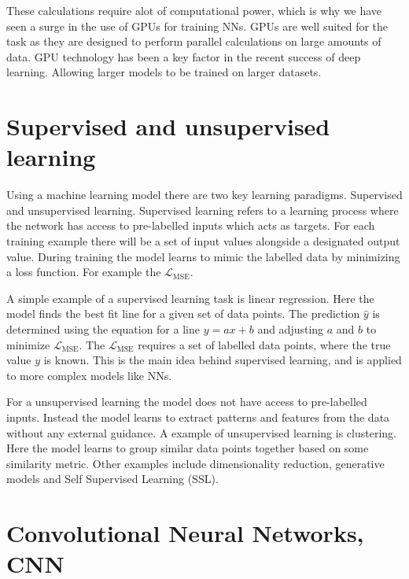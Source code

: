 These calculations require alot of computational power, which is why we have seen a surge in the use of GPUs for training NNs. GPUs are well suited for the task as they are designed to perform parallel calculations on large amounts of data. GPU technology has been a key factor in the recent success of deep learning.
Allowing larger models to be trained on larger datasets.

\section{Supervised and unsupervised learning}
Using a machine learning model there are two key learning paradigms. Supervised and unsupervised learning. Supervised learning refers to a learning process where the network has access to pre-labelled inputs which acts as targets.
For each training example there will be a set of input values alongside a designated output value. During training the model learns to mimic the labelled data by minimizing a loss function. For example the $\mathcal{L}_\text{MSE}$.

A simple example of a supervised learning task is linear regression. Here the model finds the best fit line for a given set of data points. The prediction $\hat{y}$ is determined using the equation for a line $y = ax + b$ and adjusting $a$ and $b$ to minimize $\mathcal{L}_{\text{MSE}}$.
The $\mathcal{L}_{\text{MSE}}$ requires a set of labelled data points, where the true value $y$ is known. This is the main idea behind supervised learning, and is applied to more complex models like NNs.

For a unsupervised learning the model does not have access to pre-labelled inputs. Instead the model learns to extract patterns and features from the data without any external guidance.
A example of unsupervised learning is clustering. Here the model learns to group similar data points together based on some similarity metric. Other examples include dimensionality reduction, generative models and Self Supervised Learning (SSL).

\section{Convolutional Neural Networks, CNN}


